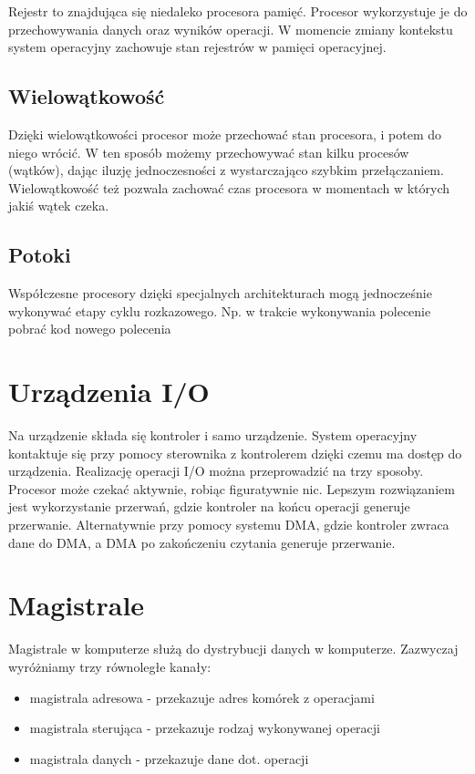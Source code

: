 \documentclass{../notatki}
\begin{document}
Rejestr to znajdująca się niedaleko procesora pamięć. Procesor wykorzystuje je
do przechowywania danych oraz wyników operacji. W momencie zmiany kontekstu
system operacyjny zachowuje stan rejestrów w pamięci operacyjnej.

\subsection{Wielowątkowość}

Dzięki wielowątkowości procesor może przechować stan procesora, i
potem do niego wrócić. W ten sposób możemy przechowywać stan kilku
procesów (wątków), dając iluzję jednoczesności z wystarczająco
szybkim przełączaniem. Wielowątkowość też pozwala zachować czas
procesora w momentach w których jakiś wątek czeka.

\subsection{Potoki}

Współczesne procesory dzięki specjalnych architekturach mogą
jednocześnie wykonywać etapy cyklu rozkazowego. Np. w trakcie
wykonywania polecenie pobrać kod nowego polecenia

\section{Urządzenia I/O}

Na urządzenie składa się kontroler i samo urządzenie. System
operacyjny kontaktuje się przy pomocy sterownika z kontrolerem dzięki
czemu ma dostęp do urządzenia. Realizację operacji I/O można przeprowadzić na
trzy sposoby. Procesor może czekać aktywnie, robiąc figuratywnie nic. Lepszym
rozwiązaniem jest wykorzystanie przerwań, gdzie kontroler na końcu
operacji generuje przerwanie. Alternatywnie przy pomocy systemu DMA,
gdzie kontroler zwraca dane do DMA, a DMA po zakończeniu czytania
generuje przerwanie.

\section{Magistrale}

Magistrale w komputerze służą do dystrybucji danych w komputerze. Zazwyczaj
wyróżniamy trzy równoległe kanały:

\begin{itemize}
  \item magistrala adresowa - przekazuje adres komórek z operacjami
  \item magistrala sterująca - przekazuje rodzaj wykonywanej operacji
  \item magistrala danych - przekazuje dane dot. operacji
\end{itemize}
\end{document}
